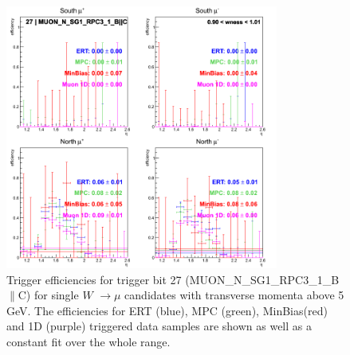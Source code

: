 \begin{figure}[ht]
\begin{center}
\includegraphics[width=0.8\textwidth]{./figures/run13_trigeffieta_w1_trig27_lin.png}
\caption{\label{fig:run13_trigeffieta_w0_nper0_trig27_lin} Trigger efficiencies for trigger bit 27 (MUON\_N\_SG1\_RPC3\_1\_B$\|$C) for single $W$ $\rightarrow \mu$ candidates with transverse momenta above 5 GeV. The efficiencies for ERT (blue), MPC (green), MinBias(red) and 1D (purple) triggered data samples are shown as well as a constant fit over the whole range.}
\end{center}
\end{figure}

\clearpage

